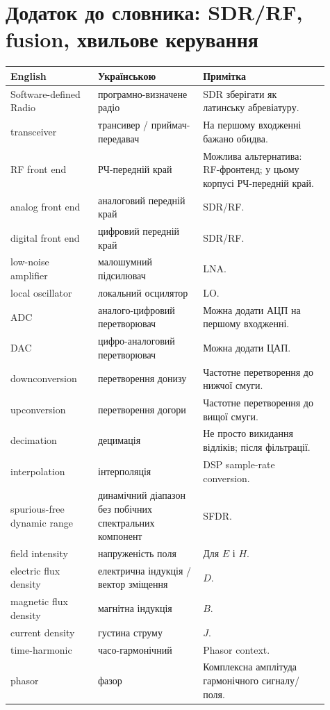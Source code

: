 \chapter{Додаток до словника: SDR/RF, fusion, хвильове керування}

\begin{longtable}{L{0.25\linewidth}L{0.30\linewidth}L{0.36\linewidth}}
\toprule
\textbf{English} & \textbf{Українською} & \textbf{Примітка}\\
\midrule
Software-defined Radio & програмно-визначене радіо & SDR зберігати як латинську абревіатуру.\\
transceiver & трансивер / приймач-передавач & На першому входженні бажано обидва.\\
RF front end & РЧ-передній край & Можлива альтернатива: RF-фронтенд; у цьому корпусі РЧ-передній край.\\
analog front end & аналоговий передній край & SDR/RF.\\
digital front end & цифровий передній край & SDR/RF.\\
low-noise amplifier & малошумний підсилювач & LNA.\\
local oscillator & локальний осцилятор & LO.\\
ADC & аналого-цифровий перетворювач & Можна додати АЦП на першому входженні.\\
DAC & цифро-аналоговий перетворювач & Можна додати ЦАП.\\
downconversion & перетворення донизу & Частотне перетворення до нижчої смуги.\\
upconversion & перетворення догори & Частотне перетворення до вищої смуги.\\
decimation & децимація & Не просто викидання відліків; після фільтрації.\\
interpolation & інтерполяція & DSP sample-rate conversion.\\
spurious-free dynamic range & динамічний діапазон без побічних спектральних компонент & SFDR.\\
field intensity & напруженість поля & Для $E$ і $H$.\\
electric flux density & електрична індукція / вектор зміщення & $D$.\\
magnetic flux density & магнітна індукція & $B$.\\
current density & густина струму & $J$.\\
time-harmonic & часо-гармонічний & Phasor context.\\
phasor & фазор & Комплексна амплітуда гармонічного сигналу/поля.\\

\end{longtable}
